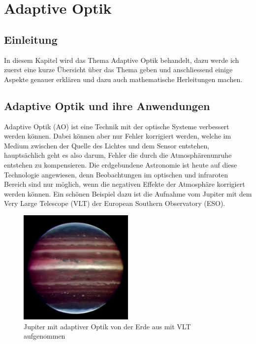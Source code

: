 \chapter{Adaptive Optik\label{chapter:thema}}
\begin{refsection}

\section{Einleitung}
In diesem Kapitel wird das Thema Adaptive Optik behandelt, dazu werde ich zuerst eine kurze Übersicht über das Thema geben und anschliessend einige Aspekte genauer erklären und dazu auch mathematische Herleitungen machen. 

\section{Adaptive Optik und ihre Anwendungen}
Adaptive Optik (AO) ist eine Technik mit der optische Systeme verbessert werden können. Dabei können aber nur Fehler korrigiert werden, welche im Medium zwischen der Quelle des Lichtes und dem Sensor entstehen, hauptsächlich geht es also darum, Fehler die durch die Atmosphärenunruhe entstehen zu kompensieren. Die erdgebundene Astronomie ist heute auf diese Technologie angewiesen, denn Beobachtungen im optischen und infraroten Bereich sind nur möglich, wenn die negativen Effekte der Atmosphäre korrigiert werden können. Ein schönen Beispiel dazu ist die Aufnahme vom Jupiter mit dem Very Large Telescope (VLT) der European Southern Observatory (ESO).

\begin{figure}
  \centering
  \includegraphics[width=0.5\textwidth]{adaptiv/images/Jupiter_adaptiv}
  \caption{Jupiter mit adaptiver Optik von der Erde aus mit VLT aufgenommen
    \cite{eso:jupiter}}
  \label{fig:jupiter}
\end{figure}


\end{refsection}
